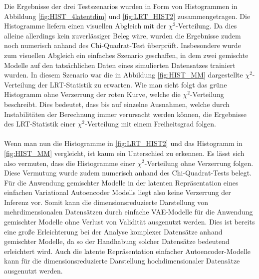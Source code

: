 \documentclass[%
thesis=student,%
coverpage=false,%
titlepage=false,%
headmarks=true, %
german,%
font=libertine, %
math=newpxtx, %
BCOR=5mm,%
coverBCOR=11mm%
]{tumbook}
\theoremstyle{break}
\begin{document}
Die Ergebnisse der drei Testszenarios wurden in Form von Histogrammen in Abbildung \ref{fig:HIST_4latentdim} und \ref{fig:LRT_HIST2} zusammengetragen. Die Histogramme liefern einen visuellen Abgleich mit der $\chi^2$-Verteilung. Da dies alleine allerdings kein zuverlässiger Beleg wäre, wurden die Ergebnisse zudem noch numerisch anhand des Chi-Quadrat-Test überprüft. Insbesondere wurde zum visuellen Abgleich ein einfaches Szenario geschaffen, in dem zwei gemischte Modelle auf den tatsächlichen Daten eines simulierten Datensatzes trainiert wurden. In diesem Szenario war die in Abbildung \ref{fig:HIST_MM} dargestellte $\chi^2$-Verteilung der LRT-Statistik zu erwarten. Wie man sieht folgt das grüne Histogramm ohne Verzerrung der roten Kurve, welche die $\chi^2$-Verteilung beschreibt. Dies bedeutet, dass bis auf einzelne Ausnahmen, welche durch Instabilitäten der Berechnung immer verursacht werden können, die Ergebnisse des LRT-Statistik einer $\chi^2$-Verteilung mit einem Freiheitsgrad folgen.\\
\\
Wenn man nun die Histogramme in \ref{fig:LRT_HIST2} und das Histogramm in \ref{fig:HIST_MM} vergleicht, ist kaum ein Unterschied zu erkennen. Es lässt sich also vermuten, dass die Histogramme einer $\chi^2$-Verteilung ohne Verzerrung folgen. Diese Vermutung wurde zudem numerisch anhand des Chi-Quadrat-Tests belegt. Für die Anwendung gemischter Modelle in der latenten Repräsentation eines einfachen Variational Autoencoder Modells liegt also keine Verzerrung der Inferenz vor. Somit kann die dimensionsreduzierte Darstellung von mehrdimensionalen Datensätzen durch einfache VAE-Modelle für die Anwendung gemischter Modelle ohne Verlust von Validität ausgenutzt werden. Dies ist bereits eine große Erleichterung bei der Analyse komplexer Datensätze anhand gemischter Modelle, da so der Handhabung solcher Datensätze bedeutend erleichtert wird. Auch die latente Repräsentation einfacher Autoencoder-Modelle kann für die dimensionsreduzierte Darstellung hochdimensionaler Datensätze ausgenutzt werden. \\
\\
\end{document}
